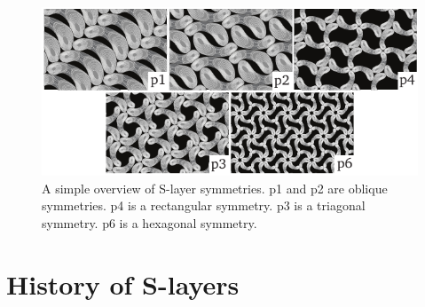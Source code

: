         \begin{figure}[htb] %
                \begin{center}
                    \includegraphics[]{intro/img/symmetries.pdf}
                \end{center}
                \caption[A simple overview of \ac{S-layer} symmetries]{A simple overview of \ac{S-layer} symmetries. p1 and p2 are oblique symmetries. 
                p4 is a rectangular symmetry.  
                p3  is a triagonal symmetry. 
                p6 is a hexagonal symmetry.}
                \label{fig:symmetries}
        \end{figure}



    \section{History of S-layers} %
    \label{sec:history_of_s_layers}
       



